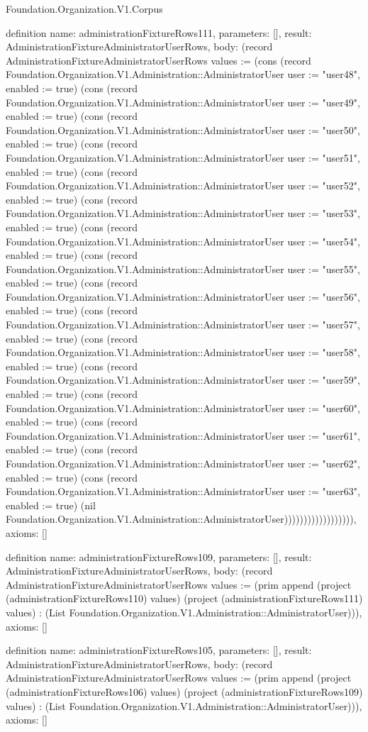 \begin{lexlean}{Foundation.Organization.V1.Corpus}
\begin{semanticmodule}
definition{
  name: administrationFixtureRows111,
  parameters: [],
  result: AdministrationFixtureAdministratorUserRows,
  body: (record AdministrationFixtureAdministratorUserRows {values := (cons (record Foundation.Organization.V1.Administration::AdministratorUser {user := "user48", enabled := true}) (cons (record Foundation.Organization.V1.Administration::AdministratorUser {user := "user49", enabled := true}) (cons (record Foundation.Organization.V1.Administration::AdministratorUser {user := "user50", enabled := true}) (cons (record Foundation.Organization.V1.Administration::AdministratorUser {user := "user51", enabled := true}) (cons (record Foundation.Organization.V1.Administration::AdministratorUser {user := "user52", enabled := true}) (cons (record Foundation.Organization.V1.Administration::AdministratorUser {user := "user53", enabled := true}) (cons (record Foundation.Organization.V1.Administration::AdministratorUser {user := "user54", enabled := true}) (cons (record Foundation.Organization.V1.Administration::AdministratorUser {user := "user55", enabled := true}) (cons (record Foundation.Organization.V1.Administration::AdministratorUser {user := "user56", enabled := true}) (cons (record Foundation.Organization.V1.Administration::AdministratorUser {user := "user57", enabled := true}) (cons (record Foundation.Organization.V1.Administration::AdministratorUser {user := "user58", enabled := true}) (cons (record Foundation.Organization.V1.Administration::AdministratorUser {user := "user59", enabled := true}) (cons (record Foundation.Organization.V1.Administration::AdministratorUser {user := "user60", enabled := true}) (cons (record Foundation.Organization.V1.Administration::AdministratorUser {user := "user61", enabled := true}) (cons (record Foundation.Organization.V1.Administration::AdministratorUser {user := "user62", enabled := true}) (cons (record Foundation.Organization.V1.Administration::AdministratorUser {user := "user63", enabled := true}) (nil Foundation.Organization.V1.Administration::AdministratorUser)))))))))))))))))}),
  axioms: []
}

definition{
  name: administrationFixtureRows109,
  parameters: [],
  result: AdministrationFixtureAdministratorUserRows,
  body: (record AdministrationFixtureAdministratorUserRows {values := (prim append (project (administrationFixtureRows110) values) (project (administrationFixtureRows111) values) : (List Foundation.Organization.V1.Administration::AdministratorUser))}),
  axioms: []
}

definition{
  name: administrationFixtureRows105,
  parameters: [],
  result: AdministrationFixtureAdministratorUserRows,
  body: (record AdministrationFixtureAdministratorUserRows {values := (prim append (project (administrationFixtureRows106) values) (project (administrationFixtureRows109) values) : (List Foundation.Organization.V1.Administration::AdministratorUser))}),
  axioms: []
}


\end{semanticmodule}
\end{lexlean}
